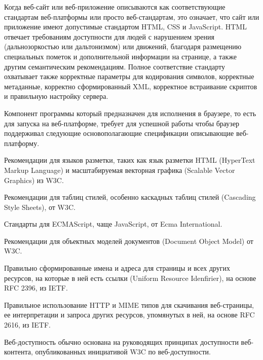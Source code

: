 Когда веб-сайт или веб-приложение описываются как соответствующие стандартам веб-платформы или просто веб-стандартам, это означает, что сайт или приложение имеют допустимые стандартом HTML, CSS и JavaScript. HTML отвечает требованиям доступности для людей с нарушением зрения (дальнозоркостью или дальтонизмом) или движений, благодаря размещению специальных пометок и дополнительной информации на странице, а также другим семантическим рекомендациям. Полное соответствие стандарту охватывает также корректные параметры для кодирования символов, корректные метаданные, корректно сформированный XML, корректное встраивание скриптов и правильную настройку сервера.

Компонент программы который предназначен для исполнения в браузере, то есть для запуска на веб-платформе, требует для успешной работы чтобы браузер поддерживал следующие основополагающие спецификации описывающие веб-платформу.

\begin{my_enumerate}
\item Рекомендации для языков разметки, таких как язык разметки HTML (HyperText Markup Language) и масштабируемая векторная графика (Scalable Vector Graphics) из W3C.
\item Рекомендации для таблиц стилей, особенно каскадных таблиц стилей (Cascading Style Sheets), от W3C.
\item Стандарты для ECMAScript, чаще JavaScript, от Ecma International.
\item Рекомендации для объектных моделей документов (Document Object Model) от W3C.
\item Правильно сформированные имена и адреса для страницы и всех других ресурсов, на которые в ней есть ссылки (Uniform Resource Idenfirier), на основе RFC 2396, из IETF.
\item Правильное использование HTTP и MIME типов для скачивания веб-страницы, ее интерпретации и запроса других ресурсов, упомянутых в ней, на основе RFC 2616, из IETF.
\item Веб-доступность обычно основана на руководящих принципах доступности веб-контента, опубликованных инициативой W3C по веб-доступности.
\end{my_enumerate}

